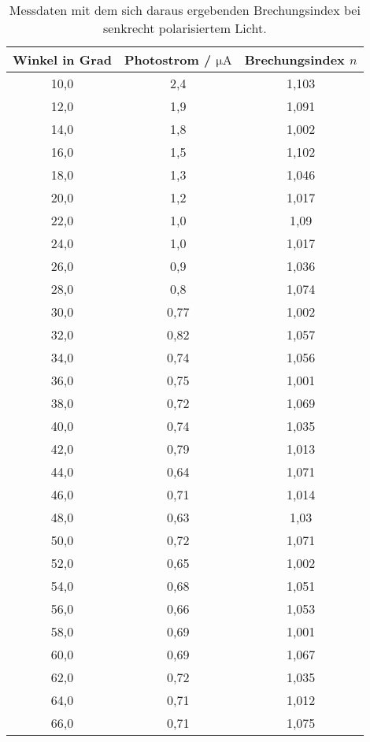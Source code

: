 \begin{table}[H]
    \centering
    \caption{Messdaten mit dem sich daraus ergebenden Brechungsindex bei senkrecht polarisiertem Licht.}
    \label{tab:spolMess}
    \begin{tabular}{c c c}
        \toprule
        Winkel in Grad & Photostrom / $\si{\micro\ampere}$  & Brechungsindex $n$ \\
        \midrule
        10,0  &  2,4  &  1,103  \\
        12,0  &  1,9  &  1,091  \\
        14,0  &  1,8  &  1,002  \\
        16,0  &  1,5  &  1,102  \\
        18,0  &  1,3  &  1,046  \\
        20,0  &  1,2  &  1,017  \\
        22,0  &  1,0  &  1,09  \\
        24,0  &  1,0  &  1,017  \\
        26,0  &  0,9  &  1,036  \\
        28,0  &  0,8  &  1,074  \\
        30,0  &  0,77  &  1,002  \\
        32,0  &  0,82  &  1,057  \\
        34,0  &  0,74  &  1,056  \\
        36,0  &  0,75  &  1,001  \\
        38,0  &  0,72  &  1,069  \\
        40,0  &  0,74  &  1,035  \\
        42,0  &  0,79  &  1,013  \\
        44,0  &  0,64  &  1,071  \\
        46,0  &  0,71  &  1,014  \\
        48,0  &  0,63  &  1,03  \\
        50,0  &  0,72  &  1,071  \\
        52,0  &  0,65  &  1,002  \\
        54,0  &  0,68  &  1,051  \\
        56,0  &  0,66  &  1,053  \\
        58,0  &  0,69  &  1,001  \\
        60,0  &  0,69  &  1,067  \\
        62,0  &  0,72  &  1,035  \\
        64,0  &  0,71  &  1,012  \\
        66,0  &  0,71  &  1,075  \\

\end{tabular}
\end{table}
